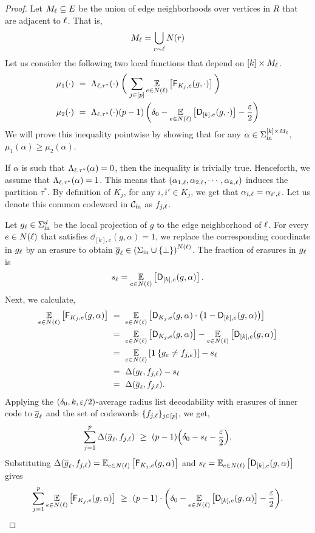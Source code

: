 	\begin{proof}
	Let $M_{\li} \sub E$ be the union of edge neighborhoods over vertices in $R$ that are adjacent to $\li$. That is, 
	\[
		M_{\li} = \bigcup_{\ri 
		\sim \li}  N(\ri)
	\]
	Let us consider the following two local functions that depend on $[k] \times M_{\li}$.
	\begin{align*}
		\mu_1(\cdot) ~&=~ \Lambda_{\li, \tau^*}(\cdot) \;\parens[\bigg]{\; \sum_{j\in [p]} \Ex{e\in N(\li)}{\fd_{K_j, e}(g,\cdot)}\,} \\
		\mu_2(\cdot) ~&=~ \Lambda_{\li, \tau^*}(\cdot) (p-1) \inparen{ \delta_0 - \Ex{e\in N(\li)}{\dd_{[k],e}(g,\cdot)}  - \frac{\eps}{2}}
	\end{align*}
	We will prove this inequality pointwise by showing that for any $\alpha \in \Sigma_{\inn}^{[k] \times M_{\li}}$, $\mu_1(\alpha) \geq \mu_2(\alpha)$.
	
	If $\alpha$ is such that $\Lambda_{\li,\tau^*}(\alpha) = 0$, then the inequality is trivially true. Henceforth, we assume that $\Lambda_{\li,\tau^*}(\alpha) = 1$. This means that $(\alpha_{1,\li},\alpha_{2,\li},\cdots ,\alpha_{k,\li})$ induces the partition $\tau^*$. 
	By definition of $K_j$, for any $i,i'\in K_j$, we get that $\alpha_{i,\li} = \alpha_{i',\li}$. Let us denote this common codeword in $\calC_{\inn}$ as $\fjl$.
	
	Let $g_{\li} \in \Sigma_{\inn}^{d}$ be the local projection of $g$ to the edge neighborhood of $\li$. For every $e\in N(\li)$ that satisfies $\dd_{[k],e}(g,\alpha) = 1$, we replace the corresponding coordinate in $g_{\li}$ by an erasure to obtain $\gl\in \inparen{ \Sigma_{\inn} \cup \{\bot\} }^{N(\li)}$. 
	The fraction of erasures in $g_{\li}$ is
	\[
		s_{\li} = \Ex{e\in N(\li)}{\dd_{[k],e}(g,\alpha)}.
	\]
	Next, we calculate,
	\begin{align*}
		\Ex{e\in N(\li)}{\fd_{K_j, e}(g,\alpha)} ~&=~ \Ex{e\in N(\li)}{\dd_{K_j, e}(g,\alpha) \cdot \inparen{1-\dd_{[k],e}(g,\alpha)}} \\
		~&=~ \Ex{e\in N(\li)}{\dd_{K_j, e}(g,\alpha)} - \Ex{e\in N(\li)}{\dd_{[k],e}(g,\alpha)} \\
		~&=~ \Ex{e\in N(\li)}{\indi{g_{e} \neq f_{j,e}}} - s_{\li} \\
		~&=~ \Delta(g_{\li},\fjl) - s_{\li} \\
		~&=~ \Delta(\gl, \fjl).
	\end{align*}
	Applying the $(\delta_0,k,\eps/2)$-average radius list decodability with erasures of inner code to $\gl$ and the set of codewords $\{\fjl\}_{j\in [p]}$, we get,
	\[
		\sum_{j=1}^p \Delta(\gl,\fjl) ~\geq~ (p-1) \parens[\Big]{\delta_0 - s_{\li} - \frac{\eps}{2}}.
	\]
	Substituting $\Delta(\gl, \fjl) = \Ex{e\in N(\li)}{\fd_{K_j, e}(g,\alpha)}$ and $s_{\li} = \Ex{e\in N(\li)}{\dd_{[k],e}(g,\alpha)}$ gives
	\begin{align*}
		\sum_{j=1}^p \Ex{e\in N(\li)}{\fd_{K_j, e}(g,\alpha)} ~\geq~ (p-1) \cdot\parens[\bigg]{\delta_0 -  \Ex{e\in N(\li)}{\dd_{[k],e}(g,\alpha)} - \frac{\eps}{2}}.\qedhere
	\end{align*}
\end{proof}



